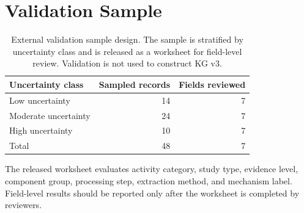 \documentclass[11pt]{article}
\begin{document}
\section{Validation Sample}
\label{app:validation}

\begin{table}[h]
\centering
\small
\caption{External validation sample design. The sample is stratified by uncertainty class and is released as a worksheet for field-level review. Validation is not used to construct KG v3.}
\label{tab:validation_sample}
\begin{tabular}{lrr}
\toprule
Uncertainty class & Sampled records & Fields reviewed \\
\midrule
Low uncertainty & 14 & 7 \\
Moderate uncertainty & 24 & 7 \\
High uncertainty & 10 & 7 \\
\midrule
Total & 48 & 7 \\
\bottomrule
\end{tabular}
\end{table}

The released worksheet evaluates activity category, study type, evidence level, component group, processing step, extraction method, and mechanism label. Field-level results should be reported only after the worksheet is completed by reviewers.



\end{document}
